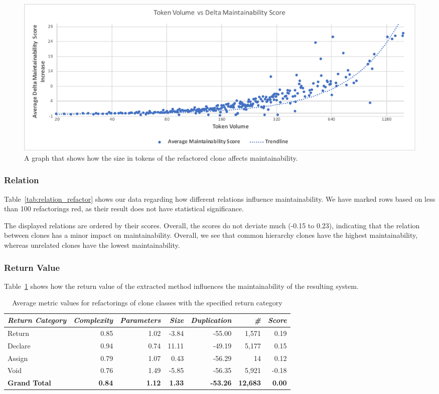 \documentclass[conference]{IEEEtran}
\begin{document}
\begin{figure}
  \includegraphics[width=1\textwidth]{img/tokenvolume}
  \caption{A graph that shows how the size in tokens of the refactored clone affects maintainability.}
  \label{fig:maintainabilityscore}
\end{figure}

\subsubsection{Relation}
Table~\ref{tab:relation_refactor} shows our data regarding how different relations influence maintainability. We have marked rows based on less than 100 refactorings red, as their result does not have statistical significance.

The displayed relations are ordered by their scores. Overall, the scores do not deviate much (-0.15 to 0.23), indicating that the relation between clones has a minor impact on maintainability. Overall, we see that common hierarchy clones have the highest maintainability, whereas unrelated clones have the lowest maintainability.

\subsubsection{Return Value}
Table~\ref{tab:return} shows how the return value of the extracted method influences the maintainability of the resulting system.

\begin{table}
\centering
\begin{tabular}{@{}lrrrrrr@{}}
\toprule
\textit{\textbf{Return Category}} & \textit{\textbf{Complexity}} & \textit{\textbf{Parameters}} & \textit{\textbf{Size}} & \textit{\textbf{Duplication}} & \textit{\textbf{\#}} & \textit{\textbf{Score}} \\ \midrule
Return & 0.85 & 1.02 & -3.84 & -55.00 & 1,571 & 0.19 \\
Declare & 0.94 & 0.74 & 11.11 & -49.19 & 5,177 & 0.15 \\
\rowcolor[HTML]{FFCCC9}
Assign & 0.79 & 1.07 & 0.43 & -56.29 & 14 & 0.12 \\
Void & 0.76 & 1.49 & -5.85 & -56.35 & 5,921 & -0.18 \\ \midrule
\textbf{Grand Total} & \textbf{0.84} & \textbf{1.12} & \textbf{1.33} & \textbf{-53.26} & \textbf{12,683} & \textbf{0.00} \\ \bottomrule
\end{tabular}
\caption{Average metric values for refactorings of clone classes with the specified return category}
\label{tab:return}
\end{table}
\end{document}
